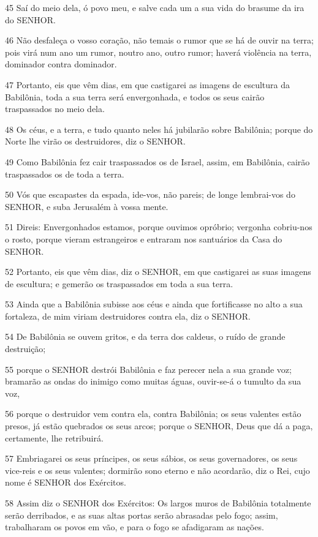 \par 45 Saí do meio dela, ó povo meu, e salve cada um a sua vida do brasume da ira do SENHOR.
\par 46 Não desfaleça o vosso coração, não temais o rumor que se há de ouvir na terra; pois virá num ano um rumor, noutro ano, outro rumor; haverá violência na terra, dominador contra dominador.
\par 47 Portanto, eis que vêm dias, em que castigarei as imagens de escultura da Babilônia, toda a sua terra será envergonhada, e todos os seus cairão traspassados no meio dela.
\par 48 Os céus, e a terra, e tudo quanto neles há jubilarão sobre Babilônia; porque do Norte lhe virão os destruidores, diz o SENHOR.
\par 49 Como Babilônia fez cair traspassados os de Israel, assim, em Babilônia, cairão traspassados os de toda a terra.
\par 50 Vós que escapastes da espada, ide-vos, não pareis; de longe lembrai-vos do SENHOR, e suba Jerusalém à vossa mente.
\par 51 Direis: Envergonhados estamos, porque ouvimos opróbrio; vergonha cobriu-nos o rosto, porque vieram estrangeiros e entraram nos santuários da Casa do SENHOR.
\par 52 Portanto, eis que vêm dias, diz o SENHOR, em que castigarei as suas imagens de escultura; e gemerão os traspassados em toda a sua terra.
\par 53 Ainda que a Babilônia subisse aos céus e ainda que fortificasse no alto a sua fortaleza, de mim viriam destruidores contra ela, diz o SENHOR.
\par 54 De Babilônia se ouvem gritos, e da terra dos caldeus, o ruído de grande destruição;
\par 55 porque o SENHOR destrói Babilônia e faz perecer nela a sua grande voz; bramarão as ondas do inimigo como muitas águas, ouvir-se-á o tumulto da sua voz,
\par 56 porque o destruidor vem contra ela, contra Babilônia; os seus valentes estão presos, já estão quebrados os seus arcos; porque o SENHOR, Deus que dá a paga, certamente, lhe retribuirá.
\par 57 Embriagarei os seus príncipes, os seus sábios, os seus governadores, os seus vice-reis e os seus valentes; dormirão sono eterno e não acordarão, diz o Rei, cujo nome é SENHOR dos Exércitos.
\par 58 Assim diz o SENHOR dos Exércitos: Os largos muros de Babilônia totalmente serão derribados, e as suas altas portas serão abrasadas pelo fogo; assim, trabalharam os povos em vão, e para o fogo se afadigaram as nações.
